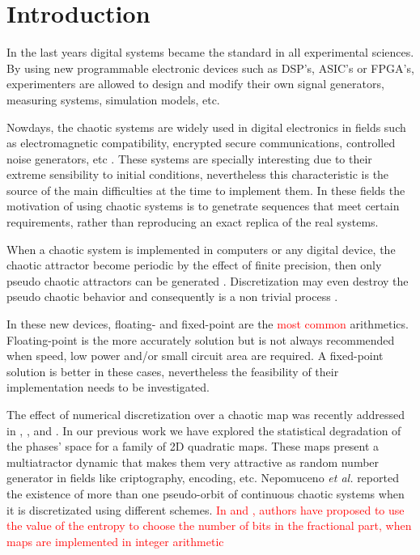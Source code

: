 \section{Introduction} \label{sec:intro}

In the last years digital systems became the standard in all experimental sciences.
By using new programmable electronic devices such as DSP's, ASIC's or FPGA's, experimenters are allowed to design and modify their own signal generators, measuring systems, simulation models, etc.

Nowdays, the chaotic systems are widely used in digital electronics in fields such as electromagnetic compatibility, encrypted secure communications, controlled noise generators, etc \cite{Machado2004,Smaoui2009,DeMicco2017,Antonelli2012,DeMicco2007A,DeMicco2007B}.
These systems are specially interesting due to their extreme sensibility to initial conditions, nevertheless this characteristic is the source of the main difficulties at the time to implement them.  
In these fields the motivation of using chaotic systems is to genetrate sequences that meet certain requirements, rather than reproducing an exact replica of the real systems.

When a chaotic system is implemented in computers or any digital device, the chaotic attractor become periodic by the effect of finite precision, then only pseudo chaotic attractors can be generated \cite{Alcover2017,Dias2011}.
Discretization may even destroy the pseudo chaotic behavior and consequently is a non trivial process \cite{DeMicco2017,Azzaz2013}.

In these new devices, floating- and fixed-point are the \textcolor{red}{most common} arithmetics.
Floating-point is the more accurately solution but is not always recommended when speed, low power and/or small circuit area are required.
A fixed-point solution is better in these cases, nevertheless the feasibility of their implementation needs to be investigated.

The effect of numerical discretization over a chaotic map was recently addressed in \cite{DeMicco2017}, \cite{Nepomuceno2017}, \cite{Tlelo-Cuautle2016} and \cite{DelaFraga2017}.
In our previous work \cite{DeMicco2017} we have explored the statistical degradation of the phases' space for a family of 2D quadratic maps.
These maps present a multiatractor dynamic that makes them very attractive as random number generator in fields like criptography, encoding, etc.
Nepomuceno \textit{et al.} \cite{Nepomuceno2017} reported the existence of more than one pseudo-orbit of continuous chaotic systems when it is discretizated using different schemes.
\textcolor{red}{In \cite{Tlelo-Cuautle2016} and \cite{DelaFraga2017}, authors have proposed to use the value of the entropy to choose the number of bits in the fractional part, when maps are implemented in integer arithmetic}

